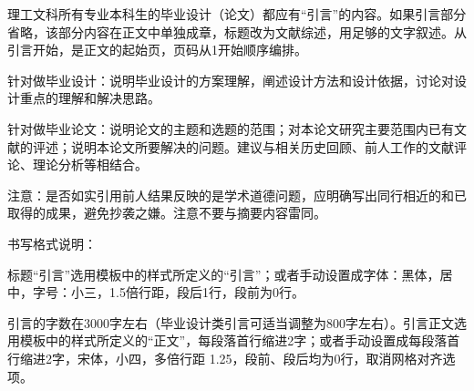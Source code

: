  \setlength{\baselineskip}{20pt}
\begin{preface}

理工文科所有专业本科生的毕业设计（论文）都应有“引言”的内容。如果引言部分省略，该部分内容在正文中单独成章，标题改为文献综述，用足够的文字叙述。从引言开始，是正文的起始页，页码从1开始顺序编排。

针对做毕业设计：说明毕业设计的方案理解，阐述设计方法和设计依据，讨论对设计重点的理解和解决思路。

针对做毕业论文：说明论文的主题和选题的范围；对本论文研究主要范围内已有文献的评述；说明本论文所要解决的问题。建议与相关历史回顾、前人工作的文献评论、理论分析等相结合。

注意：是否如实引用前人结果反映的是学术道德问题，应明确写出同行相近的和已取得的成果，避免抄袭之嫌。注意不要与摘要内容雷同。

书写格式说明：

标题“引言”选用模板中的样式所定义的“引言”；或者手动设置成字体：黑体，居中，字号：小三，1.5倍行距，段后1行，段前为0行。

引言的字数在3000字左右（毕业设计类引言可适当调整为800字左右）。引言正文选用模板中的样式所定义的“正文”，每段落首行缩进2字；或者手动设置成每段落首行缩进2字，宋体，小四，多倍行距 1.25，段前、段后均为0行，取消网格对齐选项。


	
\end{preface}